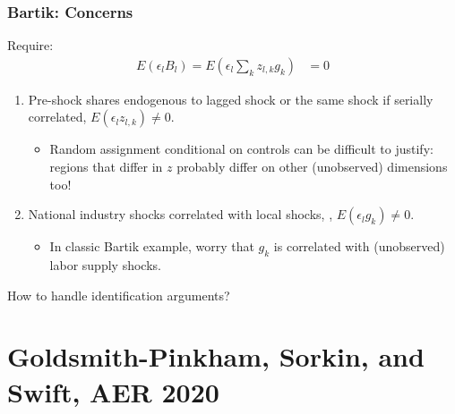 \documentclass[english,xcolor=svgnames]{beamer}
\begin{document}
\begin{frame}
\frametitle[alignment=center]{Bartik: Concerns}
Require:
\begin{align*}
		E(\epsilon_l B_l) = E(\epsilon_l \sum_k z_{l,k}g_k) &= 0  
	\end{align*}
\begin{enumerate}
	\item Pre-shock shares endogenous to lagged shock or the same shock if serially correlated, $E(\epsilon_l  z_{l,k})\neq 0$.
	\begin{itemize}
		\item Random assignment conditional on controls can be difficult to justify: regions that differ in $z$ probably differ on other (unobserved) dimensions too!
	\end{itemize}
	\item National industry shocks correlated with local shocks,
, $E(\epsilon_l  g_k)\neq 0$. 
	\begin{itemize}
		\item In classic Bartik example, worry that $g_k$ is correlated with (unobserved) labor supply shocks.
	\end{itemize}
\end{enumerate}
How to handle identification arguments?
\end{frame}








\section{Goldsmith-Pinkham, Sorkin, and Swift, AER 2020}
\end{document}
